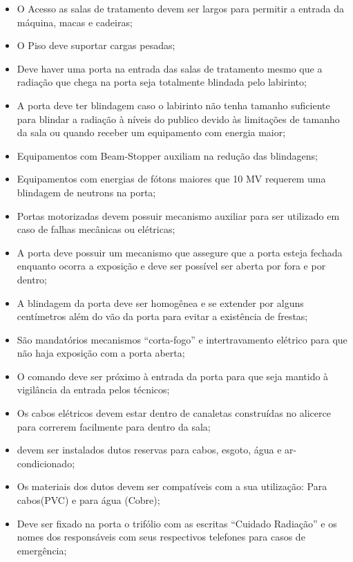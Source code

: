 \documentclass[11pt,a4paper]{article}
\begin{document}
        \begin{itemize}
            \item O Acesso as salas de tratamento devem ser largos para permitir a entrada da máquina, macas e cadeiras;
            \item O Piso deve suportar cargas pesadas;
            \item Deve haver uma porta na entrada das salas de tratamento mesmo que a radiação que chega na porta seja totalmente blindada pelo labirinto;
            \item A porta deve ter blindagem caso o labirinto não tenha tamanho suficiente para blindar a radiação à níveis do publico devido às limitações de tamanho da sala ou quando receber um equipamento com energia maior;
            \item Equipamentos com Beam-Stopper auxiliam na redução das blindagens;
            \item Equipamentos com energias de fótons maiores que 10 MV requerem uma blindagem de neutrons na porta;
            \item Portas motorizadas devem possuir mecanismo auxiliar para ser utilizado em caso de falhas mecânicas ou elétricas;
            \item A porta deve possuir um mecanismo que assegure que a porta esteja fechada enquanto ocorra a exposição e deve ser possível ser aberta por fora e por dentro;
            \item A blindagem da porta deve ser homogênea e se extender por alguns centímetros além do vão da porta para evitar a existência de frestas;
            \item  São mandatórios mecanismos ``corta-fogo'' e intertravamento elétrico para que não haja exposição com a porta aberta;
            \item O comando deve ser próximo à entrada da porta para que seja mantido à vigilância da entrada pelos técnicos;
            \item Os cabos elétricos devem estar dentro de canaletas construídas no alicerce para correrem facilmente para dentro da sala;
            \item devem ser instalados dutos reservas para cabos, esgoto, água e ar-condicionado;
            \item Os materiais dos dutos devem ser compatíveis com a sua utilização: Para cabos(PVC) e para água (Cobre);
            \item Deve ser fixado na porta o trifólio com as escritas ``Cuidado Radiação'' e os nomes dos responsáveis com seus respectivos telefones para casos de emergência;

\end{itemize}
\end{document}
